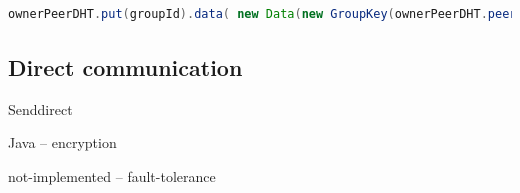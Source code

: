 \begin{lstlisting}[language=java,frame=tblr,caption={Entry signing by the group owner},label=lst:signingEntry]
ownerPeerDHT.put(groupId).data( new Data(new GroupKey(ownerPeerDHT.peerAddress(), keyPair.getPublic())).protectEntry(keyPair)).sign().start().awaitUninterruptibly();
\end{lstlisting}

\subsection{Direct communication}
Senddirect


Java -- encryption


not-implemented -- fault-tolerance
